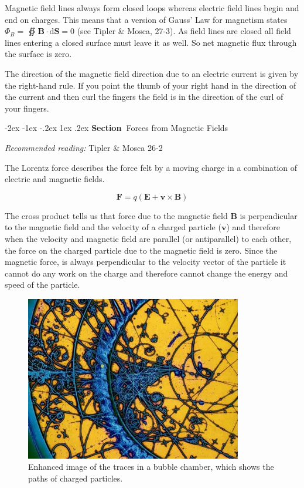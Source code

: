 \documentclass[
]{book}
\makeatletter
\renewcommand\section{%
\@startsection{section}{1}{\z@}%
              {-2ex \@plus -1ex \@minus -.2ex}%
              {1ex \@plus .2ex}%
              {\sffamily\bfseries\large\noindent Section~}}
\makeatother
\begin{document}
Magnetic field lines always form closed loops whereas electric field
lines begin and end on charges. This means that a version of Gauss' Law
for magnetism states \(\Phi_B =\) ∯ \(\mathbf{B} \cdot \mathrm{d} \mathbf{S} = 0\) (see Tipler \&
Mosca, 27-3). As field lines are closed all field lines entering a
closed surface must leave it as well. So net magnetic flux through the
surface is zero.

The direction of the magnetic field direction due to an electric current
is given by the right-hand rule. If you point the thumb of your right
hand in the direction of the current and then curl the fingers the field
is in the direction of the curl of your fingers.

\hypertarget{forces-from-magnetic-fields}{%
\section{Forces from Magnetic Fields}\label{forces-from-magnetic-fields}}

\emph{Recommended reading:} Tipler \& Mosca 26-2

The Lorentz force describes the force felt by a moving charge in a
combination of electric and magnetic fields.

\begin{equation}
\label{eq:qvCrossB}
\mathbf{F} = q(\mathbf{E} + \mathbf{v} \times \mathbf{B})
\end{equation}

The cross product tells us that force due to the magnetic field \(\mathbf{B}\) is
perpendicular to the magnetic field and the velocity of a charged
particle (\(\mathbf{v}\)) and therefore when the velocity and magnetic field are
parallel (or antiparallel) to each other, the force on the charged
particle due to the magnetic field is zero. Since the magnetic force, is
always perpendicular to the velocity vector of the particle it cannot do
any work on the charge and therefore cannot change the energy and speed
of the particle.

\begin{figure}

{\centering \includegraphics[width=0.7\linewidth]{Figures/bubble_chamber} 

}

\caption{Enhanced image of the traces in a bubble chamber, which shows the paths of charged particles.}\label{fig:bubbleChamber}
\end{figure}
\end{document}
